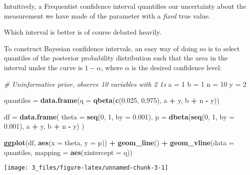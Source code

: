 \documentclass[]{article}
\newenvironment{Shaded}{\begin{snugshade}}{\end{snugshade}}
\newcommand{\CommentTok}[1]{\textcolor[rgb]{0.56,0.35,0.01}{\textit{#1}}}
\newcommand{\DataTypeTok}[1]{\textcolor[rgb]{0.13,0.29,0.53}{#1}}
\newcommand{\DecValTok}[1]{\textcolor[rgb]{0.00,0.00,0.81}{#1}}
\newcommand{\FloatTok}[1]{\textcolor[rgb]{0.00,0.00,0.81}{#1}}
\newcommand{\KeywordTok}[1]{\textcolor[rgb]{0.13,0.29,0.53}{\textbf{#1}}}
\newcommand{\NormalTok}[1]{#1}
\newcommand{\OperatorTok}[1]{\textcolor[rgb]{0.81,0.36,0.00}{\textbf{#1}}}
\newcommand{\StringTok}[1]{\textcolor[rgb]{0.31,0.60,0.02}{#1}}
\begin{document}
Intuitively, a Frequentist confidence interval quantifies our
uncertainty about the measurement we have made of the parameter with a
\emph{fixed} true value.

Which interval is better is of course debated heavily.

To construct Bayesian confidence intervals, an easy way of doing so is
to select quantiles of the posterior probability distribution such that
the area in the interval under the curve is \(1 - \alpha\), where
\(\alpha\) is the desired confidence level:

\begin{Shaded}
\begin{Highlighting}[]
\CommentTok{# Uninformative prior, observe 10 variables with 2 1s}
\NormalTok{a =}\StringTok{ }\DecValTok{1}
\NormalTok{b =}\StringTok{ }\DecValTok{1}
\NormalTok{n =}\StringTok{ }\DecValTok{10}
\NormalTok{y =}\StringTok{ }\DecValTok{2}

\NormalTok{quantiles =}\StringTok{ }\KeywordTok{data.frame}\NormalTok{(}\DataTypeTok{q =} \KeywordTok{qbeta}\NormalTok{(}\KeywordTok{c}\NormalTok{(}\FloatTok{0.025}\NormalTok{, }\FloatTok{0.975}\NormalTok{), a }\OperatorTok{+}\StringTok{ }\NormalTok{y, b }\OperatorTok{+}\StringTok{ }\NormalTok{n }\OperatorTok{-}\StringTok{ }\NormalTok{y))}

\NormalTok{df =}\StringTok{ }\KeywordTok{data.frame}\NormalTok{(}
  \DataTypeTok{theta =} \KeywordTok{seq}\NormalTok{(}\DecValTok{0}\NormalTok{, }\DecValTok{1}\NormalTok{, }\DataTypeTok{by =} \FloatTok{0.001}\NormalTok{),}
  \DataTypeTok{p =} \KeywordTok{dbeta}\NormalTok{(}\KeywordTok{seq}\NormalTok{(}\DecValTok{0}\NormalTok{, }\DecValTok{1}\NormalTok{, }\DataTypeTok{by =} \FloatTok{0.001}\NormalTok{), a }\OperatorTok{+}\StringTok{ }\NormalTok{y, b }\OperatorTok{+}\StringTok{ }\NormalTok{n }\OperatorTok{-}\StringTok{ }\NormalTok{y)}
\NormalTok{)}

\KeywordTok{ggplot}\NormalTok{(df, }\KeywordTok{aes}\NormalTok{(}\DataTypeTok{x =}\NormalTok{ theta, }\DataTypeTok{y =}\NormalTok{ p)) }\OperatorTok{+}
\StringTok{  }\KeywordTok{geom_line}\NormalTok{() }\OperatorTok{+}
\StringTok{  }\KeywordTok{geom_vline}\NormalTok{(}\DataTypeTok{data =}\NormalTok{ quantiles, }\DataTypeTok{mapping =} \KeywordTok{aes}\NormalTok{(}\DataTypeTok{xintercept =}\NormalTok{ q))}
\end{Highlighting}
\end{Shaded}

\begin{center}\texttt{[image: 3\_files/figure-latex/unnamed-chunk-3-1]} \end{center}
\end{document}
